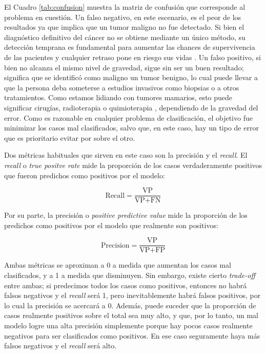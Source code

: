 El Cuadro \ref{tab:confusion} muestra la matriz de confusión que corresponde al
problema en cuestión. Un falso negativo, en este escenario, es el peor de los
resultados ya que implica que un tumor maligno no fue detectado. Si bien el
diagnóstico definitivo del cáncer no se obtiene mediante un único método, su
detección temprana es fundamental para aumentar las chances de supervivencia de
las pacientes y cualquier retraso pone en riesgo sus vidas
\parencite{saunders_jassal_2009_breast}. Un falso positivo, si bien no alcanza
el mismo nivel de gravedad, sigue sin ser un buen resultado; significa que se
identificó como maligno un tumor benigno, lo cual puede llevar a que la persona
deba someterse a estudios invasivos como biopsias o a otros tratamientos. Como
estamos lidiando con tumores mamarios, esto puede significar cirugías,
radioterapia o quimioterapia \parencite{saunders_jassal_2009_breast},
dependiendo de la gravedad del error. Como es razonable en cualquier problema
de clasificación, el objetivo fue minimizar los casos mal clasificados, salvo
que, en este caso, hay un tipo de error que es prioritario evitar por sobre el
otro.

Dos métricas habituales que sirven en este caso son la precisión y el
\textit{recall}. El \textit{recall} o \textit{true positve rate} mide la
proporción de los casos verdaderamente positivos que fueron predichos como
positivos por el modelo:

\begin{equation}
\text{Recall} = \frac{\text{VP}}{\text{VP} + \text{FN}}
\end{equation}

Por su parte, la precisión o \textit{positive predictive value} mide la
proporción de los predichos como positivos por el modelo que realmente son
positivos:

\begin{equation}
\text{Precision} = \frac{\text{VP}}{\text{VP} + \text{FP}}
\end{equation}

Ambas métricas se aproximan a 0 a medida que aumentan los casos mal
clasificados, y a 1 a medida que disminuyen. Sin embargo, existe cierto
\textit{trade-off} entre ambas; si predecimos todos los casos como positivos,
entonces no habrá falsos negativos y el \textit{recall} será 1, pero
inevitablemente habrá falsos positivos, por lo cual la precisión se acercará a
0. Además, puede suceder que la proporción de casos realmente positivos sobre
el total sea muy alto, y que, por lo tanto, un mal modelo logre una alta
precisión simplemente porque hay pocos casos realmente negativos para ser
clasificados como positivos. En ese caso seguramente haya más falsos negativos
y el \textit{recall} será alto.

